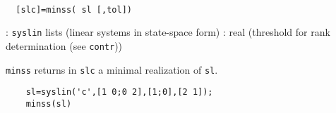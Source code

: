\begin{mandesc}
   \\ %
\end{mandesc}
\begin{calling_sequence}
\begin{verbatim}
  [slc]=minss( sl [,tol])  
\end{verbatim}
\end{calling_sequence}
\begin{parameters}
  \begin{varlist}
    : \verb!syslin! lists (linear systems in state-space form)
    : real (threshold for rank determination (see \verb!contr!))
  \end{varlist}
\end{parameters}
\begin{mandescription}
  \verb!minss! returns in \verb!slc! a minimal realization of \verb!sl!.
\end{mandescription}
\begin{examples}
  \begin{Verbatim}
    sl=syslin('c',[1 0;0 2],[1;0],[2 1]);
    minss(sl)
  \end{Verbatim}
\end{examples}
\begin{manseealso}
         
\end{manseealso}

